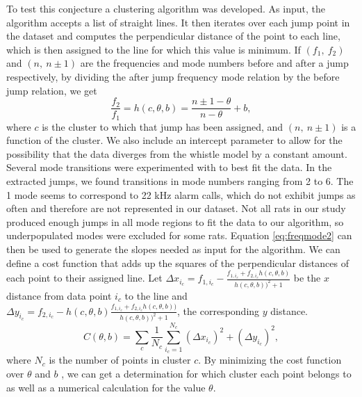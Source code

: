 \documentclass[twocolumn, prX]{revtex4}
\begin{document}
To test this conjecture a clustering algorithm was developed. As input, the algorithm accepts a list of straight lines. It then iterates over each jump point in the dataset and computes the perpendicular distance of the point to each line, which is then assigned to the line for which this value is minimum. If $\left(f_{1},\: f_{2}\right)$ and $\left(n,\: n\pm1\right)$ are the frequencies and mode numbers before and after a jump respectively, by dividing the after jump frequency mode relation by the before jump relation, we get \begin{equation}
\frac{f_{2}}{f_{1}}=h(c,\theta,b)=\frac{n\pm1-\theta}{n-\theta} + b,\label{eq:freqmode2}
\end{equation}
where $c$ is the cluster to which that jump has been assigned, and $\left(n,\: n\pm1\right)$ is a function of the cluster. We also include an intercept parameter to allow for the possibility that the data diverges from the whistle model by a constant amount. Several mode transitions were experimented with to best fit the data. In the extracted jumps, we found transitions in mode numbers ranging from 2 to 6. The 1 mode seems to correspond to 22 kHz alarm calls, which do not exhibit jumps as often and therefore are not represented in our dataset. Not all rats in our study produced enough jumps in all mode regions to fit the data to our algorithm, so underpopulated modes were excluded for some rats. Equation \ref{eq:freqmode2} can then be used to generate the slopes needed as input for the algorithm. We can define a cost function that adds up the squares of the perpendicular distances of each point to their assigned line. Let $\Delta x_{i_c}=f_{1,i_c}-\frac{f_{1,i_c}+f_{2,i_c}h\left(c,\theta, b\right)}{h\left(c,\theta, b\right))^{2}+1}$ be the $x$ distance from data point $i_c$ to the line and $\Delta y_{i_c}=f_{2,i_c}-h\left(c,\theta, b\right)\frac{f_{1,i_c}+f_{2,i_c}h\left(c,\theta, b\right))}{h\left(c,\theta, b\right))^{2}+1}$, the corresponding $y$ distance. 
\begin{equation}
C\left(\theta, b\right)=\sum_{c}\frac{1}{N_{c}}\sum_{i_c=1}^{N_{c}}\left(\Delta x_{i_c}\right)^{2}+\left(\Delta y_{i_c}\right)^{2},\label{eq:cost}
\end{equation}
where $N_{c}$ is the number of points in cluster $c$. By minimizing the cost function over $\theta$ and $b$ , we can get a determination for which cluster each point belongs to as well as a numerical calculation for the value $\theta$.
\end{document}

